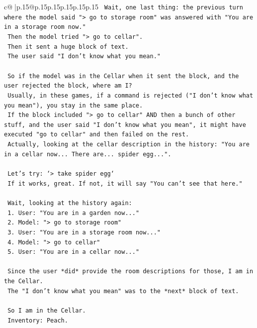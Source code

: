 \documentclass{article}
\begin{document}
{\begin{supertabular}{c@{$\;$}|p{.15\linewidth}@{}p{.15\linewidth}p{.15\linewidth}p{.15\linewidth}p{.15\linewidth}p{.15\linewidth}}
{{{\texttt{    Wait, one last thing: the previous turn where the model said "> go to storage room" was answered with "You are in a storage room now."} \\
\texttt{    Then the model tried "> go to cellar".} \\
\texttt{    Then it sent a huge block of text.} \\
\texttt{    The user said "I don't know what you mean."} \\
\\ 
\texttt{    So if the model was in the Cellar when it sent the block, and the user rejected the block, where am I?} \\
\texttt{    Usually, in these games, if a command is rejected ("I don't know what you mean"), you stay in the same place.} \\
\texttt{    If the block included "> go to cellar" AND then a bunch of other stuff, and the user said "I don't know what you mean", it might have executed "go to cellar" and then failed on the rest.} \\
\texttt{    Actually, looking at the cellar description in the history: "You are in a cellar now... There are... spider egg...".} \\
\\ 
\texttt{    Let's try: `> take spider egg`} \\
\texttt{    If it works, great. If not, it will say "You can't see that here."} \\
\\ 
\texttt{    Wait, looking at the history again:} \\
\texttt{    1. User: "You are in a garden now..."} \\
\texttt{    2. Model: "> go to storage room"} \\
\texttt{    3. User: "You are in a storage room now..."} \\
\texttt{    4. Model: "> go to cellar"} \\
\texttt{    5. User: "You are in a cellar now..."} \\
\\ 
\texttt{    Since the user *did* provide the room descriptions for those, I am in the Cellar.} \\
\texttt{    The "I don't know what you mean" was to the *next* block of text.} \\
\\ 
\texttt{    So I am in the Cellar.} \\
\texttt{    Inventory: Peach.} \\
}}}
\end{supertabular}}
\end{document}
